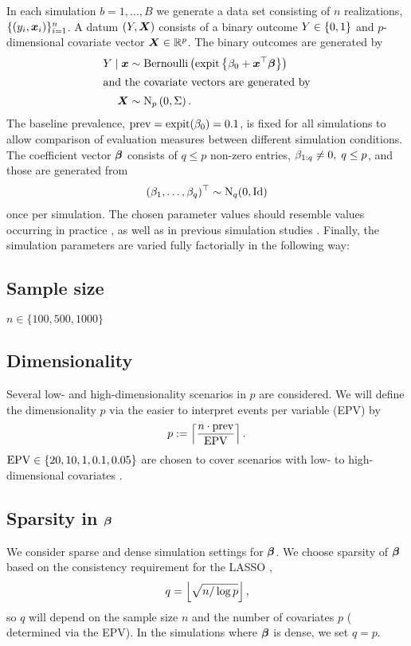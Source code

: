 \documentclass[a4paper, 11pt]{article}\usepackage[]{graphicx}\usepackage[]{color}
\begin{document}
In each simulation $b = 1, \dots, B$ we generate a data set consisting of $n$
realizations, \ie $\{(y_i, \text{\boldmath$x$}_i)\}_{i=1}^n$. A datum $(Y, \text{\boldmath$X$})$ consists of
a binary outcome $Y \in \{0, 1\}$ and $p$-dimensional covariate vector
$\text{\boldmath$X$} \in \mathbb{R}^p$. The binary outcomes are generated by
\begin{align*}
  Y \mid \text{\boldmath$x$} &\sim \operatorname{Bernoulli}\left(\operatorname{expit}\left\{\beta_0 + \text{\boldmath$x$}^\top\text{\boldmath$\beta$}\right\}\right) \\
\intertext{and the covariate vectors are generated by}
  \text{\boldmath$X$} &\sim \operatorname{N}_p\left(0, \Sigma\right).
\end{align*}
The baseline prevalence, $\operatorname{prev} = \operatorname{expit}(\beta_0) = 0.1$, is fixed for all
simulations to allow comparison of evaluation measures between different
simulation conditions. The coefficient vector $\text{\boldmath$\beta$}$ consists of
$q \leq p$ non-zero entries, \ie $\beta_{1:q} \neq 0, \; q \leq p$, and
those are generated from
\begin{align*}
  (\beta_1, \dots, \beta_q)^\top \sim \operatorname{N}_q(0, \operatorname{Id})
\end{align*}
once per simulation. The chosen parameter values should resemble values
occurring in practice , as well as in previous simulation studies
. Finally, the simulation parameters are varied fully factorially in
the following way:



\subsection*{Sample size}
$n \in \{100, 500, 1000\}$

\subsection*{Dimensionality}
Several low- and high-dimensionality scenarios in $p$ are considered. We will
define the dimensionality $p$ via the easier to interpret events per variable
(EPV) by $$p := \left\lceil\frac{n \cdot \operatorname{prev}}{\operatorname{EPV}}\right\rceil.$$ $\operatorname{EPV} \in \{20, 10, 1, 0.1, 0.05\}$
are chosen to cover scenarios with low- to high-dimensional covariates
\citep[\cf][]{vanSmeden2018}.

\subsection*{Sparsity in $\text{\boldmath$\beta$}$}
We consider sparse and dense simulation settings for $\text{\boldmath$\beta$}$. We choose
sparsity of $\text{\boldmath$\beta$}$ based on the consistency requirement for the LASSO
\citep[Ch. 2.4.2]{buhlmann2011statistics}, \ie
$$q = \left\lfloor\sqrt{n/\log p}\right\rfloor,$$ so $q$ will depend on the sample size
$n$ and the number of covariates $p$ ( determined via the EPV).
In the simulations where $\text{\boldmath$\beta$}$ is dense, we set $q = p$.
\end{document}
